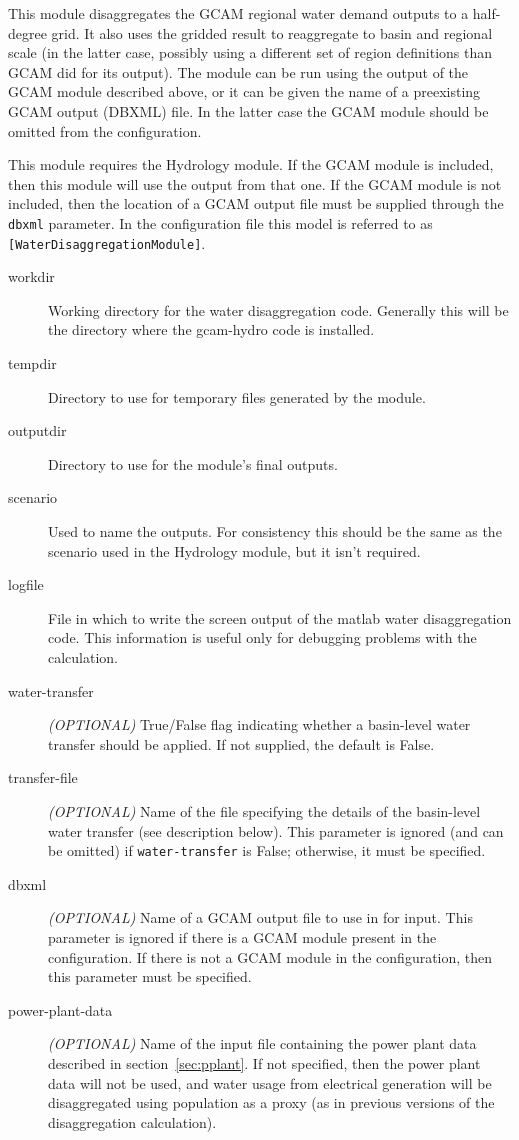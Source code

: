 \documentclass[11pt]{article}
\begin{document}
This module disaggregates the GCAM regional water demand outputs to a
half-degree grid.  It also uses the gridded result to reaggregate to
basin and regional scale (in the latter case, possibly using a
different set of region definitions than GCAM did for its output).
The module can be run using the output of the GCAM module described
above, or it can be given the name of a preexisting GCAM output
(DBXML) file.  In the latter case the GCAM module should be omitted
from the configuration.

This module requires the Hydrology module.  If the GCAM module is
included, then this module will use the output from that one.  If the
GCAM module is not included, then the location of a GCAM output file
must be supplied through the \texttt{dbxml} parameter.  In the
configuration file this model is referred to as
\texttt{[WaterDisaggregationModule]}.

\begin{description}
\item[workdir] Working directory for the water disaggregation code.
  Generally this will be the directory where the gcam-hydro code is
  installed.
\item[tempdir] Directory to use for temporary files generated by the
  module.
\item[outputdir] Directory to use for the module's final outputs.
\item[scenario] Used to name the outputs.  For consistency this should
  be the same as the scenario used in the Hydrology module, but it
  isn't required.
\item[logfile] File in which to write the screen output of the matlab
  water disaggregation code.  This information is useful only for
  debugging problems with the calculation.
\item[water-transfer] \emph{(OPTIONAL)} True/False flag indicating
  whether a basin-level water transfer should be applied.  If not
  supplied, the default is False.
\item[transfer-file] \emph{(OPTIONAL)} Name of the file specifying the
  details of the basin-level water transfer (see description below).
  This parameter is ignored (and can be omitted) if
  \texttt{water-transfer} is False; otherwise, it must be specified.
\item[dbxml] \emph{(OPTIONAL)} Name of a GCAM output file to use in
  for input.  This parameter is ignored if there is a GCAM module
  present in the configuration.  If there is not a GCAM module in the
  configuration, then this parameter must be specified.
\item[power-plant-data] \emph{(OPTIONAL)} Name of the input file
  containing the power plant data described in
  section~\ref{sec:pplant}.  If not specified, then the power plant
  data will not be used, and water usage from electrical generation
  will be disaggregated using population as a proxy (as in previous
  versions of the disaggregation calculation).
\end{description}
\end{document}

